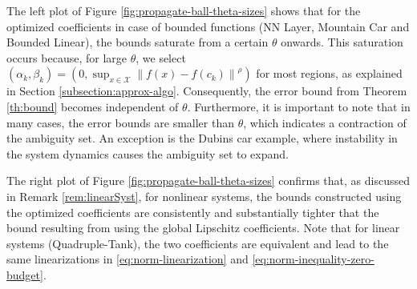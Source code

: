 \documentclass[11pt, a4paper, oneside,reqno]{amsart}
\theoremstyle{plain}
\newcommand{\norm}[1]{\left\lVert#1\right\rVert}
\def\sX{{\mathcal{X}}}
\begin{document}
The left plot of Figure \ref{fig:propagate-ball-theta-sizes} shows that for the optimized coefficients in case of bounded functions (NN Layer, Mountain Car and Bounded Linear), the bounds saturate from a certain $\theta$ onwards. This saturation occurs because, for large $\theta$, we select $(\alpha_k, \beta_k)=(0,\sup_{x\in \sX}\norm{f(x)-f(c_k)}^\rho)$ for most regions, as explained in Section \ref{subsection:approx-algo}. Consequently, the error bound from Theorem \ref{th:bound} becomes independent of \(\theta\).
Furthermore, it is important to note that in many cases, the error bounds are smaller than $\theta$, which indicates a contraction of the ambiguity set. An exception is the Dubins car example, where instability in the system dynamics causes the ambiguity set to expand.

The right plot of Figure \ref{fig:propagate-ball-theta-sizes} confirms that, as discussed in Remark \ref{rem:linearSyst}, for nonlinear systems, the bounds constructed using the optimized coefficients are consistently and substantially tighter that the bound resulting from using the global Lipschitz coefficients. Note that for linear systems (Quadruple-Tank), the two coefficients are equivalent and lead to the same linearizations in \eqref{eq:norm-linearization} and \eqref{eq:norm-inequality-zero-budget}. 
\end{document}

